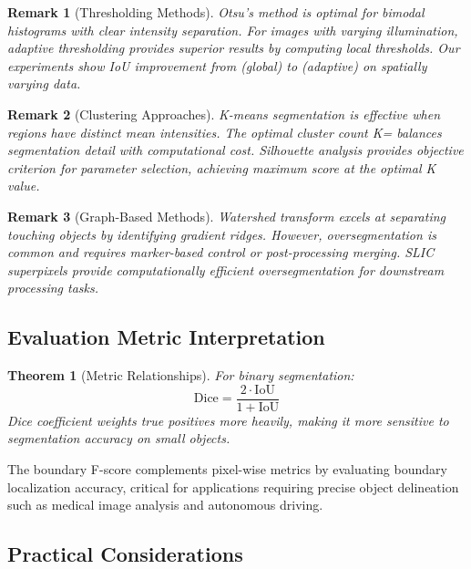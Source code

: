 \documentclass[a4paper, 11pt]{article}
\newtheorem{theorem}{Theorem}[section]
\newtheorem{remark}{Remark}[section]
\begin{document}
\begin{remark}[Thresholding Methods]
Otsu's method is optimal for bimodal histograms with clear intensity separation. For images
with varying illumination, adaptive thresholding provides superior results by computing
local thresholds. Our experiments show IoU improvement from  (global)
to  (adaptive) on spatially varying data.
\end{remark}

\begin{remark}[Clustering Approaches]
K-means segmentation is effective when regions have distinct mean intensities. The optimal
cluster count K= balances segmentation detail with computational cost.
Silhouette analysis provides objective criterion for parameter selection, achieving maximum
score  at the optimal K value.
\end{remark}

\begin{remark}[Graph-Based Methods]
Watershed transform excels at separating touching objects by identifying gradient ridges.
However, oversegmentation is common and requires marker-based control or post-processing
merging. SLIC superpixels provide computationally efficient oversegmentation for downstream
processing tasks.
\end{remark}

\subsection{Evaluation Metric Interpretation}

\begin{theorem}[Metric Relationships]
For binary segmentation:
\begin{equation}
\text{Dice} = \frac{2 \cdot \text{IoU}}{1 + \text{IoU}}
\end{equation}
Dice coefficient weights true positives more heavily, making it more sensitive to
segmentation accuracy on small objects.
\end{theorem}

The boundary F-score complements pixel-wise metrics by evaluating boundary localization
accuracy, critical for applications requiring precise object delineation such as medical
image analysis and autonomous driving.

\subsection{Practical Considerations}
\end{document}

